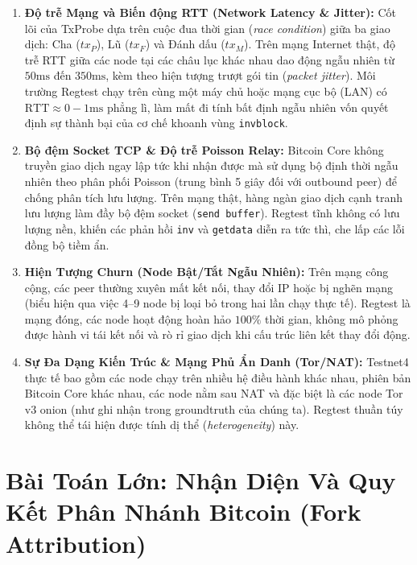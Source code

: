 \documentclass[11pt,a4paper]{article}
\begin{document}
\begin{enumerate}
    \item \textbf{Độ trễ Mạng và Biến động RTT (Network Latency \& Jitter):}
    Cốt lõi của TxProbe dựa trên cuộc đua thời gian (\textit{race condition}) giữa ba giao dịch: Cha ($tx_P$), Lũ ($tx_F$) và Đánh dấu ($tx_M$). Trên mạng Internet thật, độ trễ RTT giữa các node tại các châu lục khác nhau dao động ngẫu nhiên từ $50\text{ms}$ đến $350\text{ms}$, kèm theo hiện tượng trượt gói tin (\textit{packet jitter}). Môi trường Regtest chạy trên cùng một máy chủ hoặc mạng cục bộ (LAN) có $\text{RTT} \approx 0 - 1\text{ms}$ phẳng lì, làm mất đi tính bất định ngẫu nhiên vốn quyết định sự thành bại của cơ chế khoanh vùng \texttt{invblock}.
    
    \item \textbf{Bộ đệm Socket TCP \& Độ trễ Poisson Relay:}
    Bitcoin Core không truyền giao dịch ngay lập tức khi nhận được mà sử dụng bộ định thời ngẫu nhiên theo phân phối Poisson (trung bình 5 giây đối với outbound peer) để chống phân tích lưu lượng. Trên mạng thật, hàng ngàn giao dịch cạnh tranh lưu lượng làm đầy bộ đệm socket (\texttt{send buffer}). Regtest tĩnh không có lưu lượng nền, khiến các phản hồi \texttt{inv} và \texttt{getdata} diễn ra tức thì, che lấp các lỗi đồng bộ tiềm ẩn.
    
    \item \textbf{Hiện Tượng Churn (Node Bật/Tắt Ngẫu Nhiên):}
    Trên mạng công cộng, các peer thường xuyên mất kết nối, thay đổi IP hoặc bị nghẽn mạng (biểu hiện qua việc 4--9 node bị loại bỏ trong hai lần chạy thực tế). Regtest là mạng đóng, các node hoạt động hoàn hảo $100\%$ thời gian, không mô phỏng được hành vi tái kết nối và rò rỉ giao dịch khi cấu trúc liên kết thay đổi động.
    
    \item \textbf{Sự Đa Dạng Kiến Trúc \& Mạng Phủ Ẩn Danh (Tor/NAT):}
    Testnet4 thực tế bao gồm các node chạy trên nhiều hệ điều hành khác nhau, phiên bản Bitcoin Core khác nhau, các node nằm sau NAT và đặc biệt là các node Tor v3 onion (như ghi nhận trong groundtruth của chúng ta). Regtest thuần túy không thể tái hiện được tính dị thể (\textit{heterogeneity}) này.
\end{enumerate}

\section{Bài Toán Lớn: Nhận Diện Và Quy Kết Phân Nhánh Bitcoin (Fork Attribution)}
\end{document}
